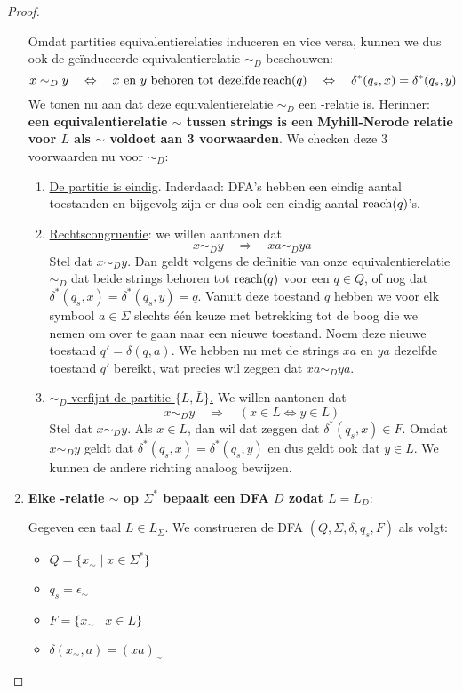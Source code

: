 \documentclass[../aanvullingen_cursus.tex]{subfiles}
\begin{document}
\begin{proof}
\begin{enumerate}
		Omdat partities equivalentierelaties induceren en vice versa, kunnen we dus ook de geïnduceerde equivalentierelatie \(\sim_D\) beschouwen: \[x \sim_D y \quad \Leftrightarrow \quad x \text{ en } y \text{ behoren tot dezelfde} \operatorname{reach}(q) \quad \Leftrightarrow \quad \delta^*(q_s,x)=\delta^*(q_s,y)\] We tonen nu aan dat deze equivalentierelatie \(\sim_D\) een \mnl-relatie is. Herinner: \textbf{een equivalentierelatie \(\sim\) tussen strings is een Myhill-Nerode relatie voor \(L\) als \(\sim\) voldoet aan 3 voorwaarden}. We checken deze 3 voorwaarden nu voor \(\sim_D\):
		\begin{enumerate}
			\item \underline{De partitie is eindig}. Inderdaad: DFA's hebben een eindig aantal toestanden en bijgevolg zijn er dus ook een eindig aantal \(\operatorname{reach}(q)\)'s.
			\item \underline{Rechtscongruentie}: we willen aantonen dat \[x \sim_D y \quad \Rightarrow \quad xa \sim_D ya\] Stel dat \(x \sim_D y\). Dan geldt volgens de definitie van onze equivalentierelatie \(\sim_D\) dat beide strings behoren tot \(\operatorname{reach}(q)\) voor een \(q\in Q\), of nog dat \(\delta^*(q_s,x)=\delta^*(q_s,y)=q\). Vanuit deze toestand \(q\) hebben we voor elk symbool \(a \in \Sigma\) slechts één keuze met betrekking tot de boog die we nemen om over te gaan naar een nieuwe toestand. Noem deze nieuwe toestand \(q'=\delta(q,a)\). We hebben nu met de strings \(xa\) en \(ya\) dezelfde toestand \(q'\) bereikt, wat precies wil zeggen dat \(xa \sim_D ya\).
			\item \underline{\(\sim_D\) verfijnt de partitie \(\{L,\bar{L}\}\).} We willen aantonen dat \[x \sim_D y \quad \Rightarrow \quad (x\in L \Leftrightarrow y \in L)\] Stel dat \(x \sim_D y\). Als \(x \in L\), dan wil dat zeggen dat \(\delta^*(q_s,x)\in F\). Omdat \(x \sim_D y\) geldt dat \(\delta^*(q_s,x)=\delta^*(q_s,y)\) en dus geldt ook dat \(y \in L\). We kunnen de andere richting analoog bewijzen.
		\end{enumerate}

		\newpage
		\item \underline{\textbf{Elke \mnl-relatie \(\sim\) op \(\Sigma^*\) bepaalt een DFA \(D\) zodat \(L=L_D\)}}:

		Gegeven een taal \(L \in L_\Sigma\). We construeren de DFA \((Q,\Sigma,\delta,q_s,F)\) als volgt:
		\begin{itemize}
			\item \(Q=\{x_{\sim} \mid x \in \Sigma^*\}\)
			\item \(q_s = \epsilon_{\sim}\)
			\item \(F = \{x_{\sim} \mid x \in L\}\)
			\item \(\delta(x_{\sim},a)=(xa)_{\sim}\)
		\end{itemize}


\end{enumerate}
\end{proof}
\end{document}
